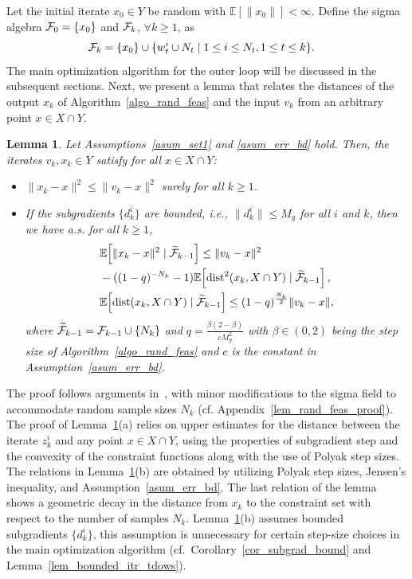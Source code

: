\documentclass{article}
\def\cF{{\cal F}}
\def\dist{{\rm dist}}
\newcommand{\EXP}[1]
{\mathbb{E}\!\left[#1\right] }
\theoremstyle{plain}
\newtheorem{lemma}[theorem]{Lemma}
\theoremstyle{definition}
\theoremstyle{remark}
\begin{document}
Let the initial iterate $x_0 \in Y$ be random with $\EXP{\|x_0\|} < \infty$. Define the sigma algebra $\cF_{0}=\{x_0\}$ and $\cF_{k}$, $\forall k \geq 1$, as
\begin{align}
    \cF_{k} = \{x_0\} &\cup \{w_t^i \cup N_t \mid 1 \leq i \leq N_t, 1 \leq t \leq k\} .\label{sigma_field}
\end{align}
The main optimization algorithm for the outer loop will be discussed in the subsequent sections. Next, we present a lemma that relates the distances of the output $x_k$ of Algorithm~\ref{algo_rand_feas} and the input $v_k$ from an arbitrary point $x \in X \cap Y$.
\begin{lemma}\label{lem_rand_feas}
Let Assumptions~\ref{asum_set1} and \ref{asum_err_bd} hold. Then, the iterates $v_k, x_k \in Y$ satisfy for all $x \in X \cap Y$:
\begin{itemize}
    \item [(a)] $\|x_k - x \|^2 \leq \|v_k-x\|^2$ surely for all $k \geq 1$. 
    \item[(b)]
    If the subgradients $\{d_k^i\}$ are bounded, i.e., $\|d_k^i\| \leq M_g$ for all $i$ and $k$, then we have a.s. for all $k \geq 1$,
    \begin{align*}
        &\EXP{\|x_k - x\|^2 \mid \widetilde \cF_{k-1}} \leq \|v_k - x\|^2 \\
        &- ((1-q)^{-N_k} - 1) \EXP{\dist^2(x_k, X \cap Y) \mid \widetilde \cF_{k-1}} ,\\
        &\EXP{\dist(x_k, X \cap Y) \mid \widetilde \cF_{k-1}} \leq (1-q)^{\frac{N_k}{2}} \|v_k - x\| ,
    \end{align*}
    where $\widetilde \cF_{k-1} = \cF_{k-1} \cup \{N_k\}$ and $q = \frac{\beta(2- \beta)}{c M_g^2}$ with $\beta \in (0,2)$ being the step size of Algorithm~\ref{algo_rand_feas} and $c$ is the constant in Assumption~\ref{asum_err_bd}.
    \end{itemize}
\end{lemma}
%
%
The proof follows arguments in~\cite{polyak1969minimization, polyak2001random, nedic2019random, chakraborty2025randomized}, with minor modifications to the sigma field to accommodate random sample sizes $N_k$ (cf. Appendix~\ref{lem_rand_feas_proof}). The proof of Lemma~\ref{lem_rand_feas}(a) relies on upper estimates for the distance between the iterate $z_k^i$ and any point $x \in X \cap Y$, using the properties of subgradient step and the convexity of the constraint functions along with the use of Polyak step sizes. The relations in Lemma~\ref{lem_rand_feas}(b) are obtained by utilizing Polyak step sizes, Jensen's inequality, and Assumption~\ref{asum_err_bd}. The last relation of the lemma shows a geometric decay in the distance from $x_k$ to the constraint set with respect to the number of samples $N_k$. Lemma~\ref{lem_rand_feas}(b) assumes bounded subgradients $\{d_k^i\}$, this assumption is unnecessary for certain step-size choices in the main optimization algorithm (cf.\ Corollary~\ref{cor_subgrad_bound} and Lemma~\ref{lem_bounded_itr_tdows}).
\end{document}
